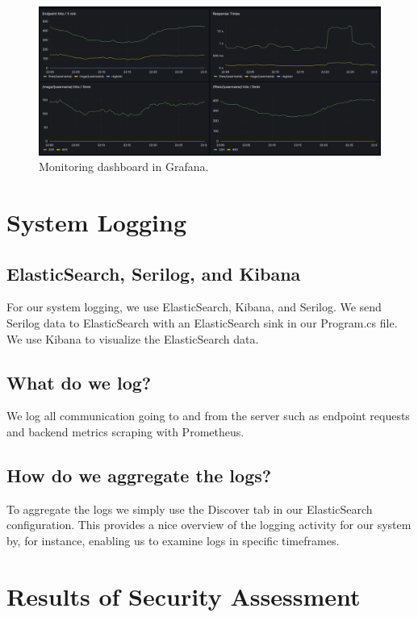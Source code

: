 \begin{figure}[h]
    \centering
    \includegraphics[width=1\textwidth]{images/grafana.png}
    \caption{Monitoring dashboard in Grafana.}
    \label{fig:grafana}
\end{figure}


\newpage
\section{System Logging}

\subsection{ElasticSearch, Serilog, and Kibana}

For our system logging, we use ElasticSearch, Kibana, and Serilog. We send Serilog data to ElasticSearch with an ElasticSearch sink in our Program.cs file. We use Kibana to visualize the ElasticSearch data.

\subsection{What do we log?}

We log all communication going to and from the server such as endpoint requests and backend metrics scraping with Prometheus.

\subsection{How do we aggregate the logs?}

To aggregate the logs we simply use the Discover tab in our ElasticSearch configuration. This provides a nice overview of the logging activity for our system by, for instance, enabling us to examine logs in specific timeframes.

\newpage


\section{Results of Security Assessment}


